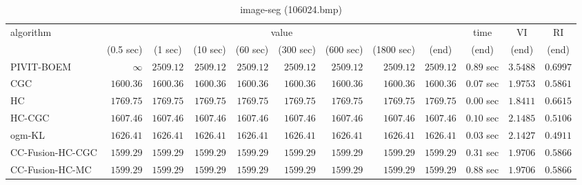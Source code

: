 \begin{table}[H]
\scriptsize
\centering
\caption{image-seg (106024.bmp)}
\label{tab:anytimetable-image-seg-106024.bmp}
\begin{tabular}{lrrrrrrrrrrr}
\toprule
           algorithm &                                   \multicolumn{8}{c}{value} & \multicolumn{1}{c}{time}    & \multicolumn{1}{c}{VI}  & \multicolumn{1}{c}{RI} \\  
\cmidrule(lr){2-9}\cmidrule(lr){10-10} \cmidrule(lr){11-11} \cmidrule(lr){12-12}   
                     & \multicolumn{1}{c}{(0.5 sec)} & \multicolumn{1}{c}{(1 sec)} & \multicolumn{1}{c}{(10 sec)} & \multicolumn{1}{c}{(60 sec)} & \multicolumn{1}{c}{(300 sec)} & \multicolumn{1}{c}{(600 sec)} & \multicolumn{1}{c}{(1800 sec)} & \multicolumn{1}{c}{(end)} & \multicolumn{1}{c}{(end)}    & \multicolumn{1}{c}{(end)}   & \multicolumn{1}{c}{(end)}  \\ \midrule 
          PIVIT-BOEM & $\infty$ & $      2509.12$ & $      2509.12$ & $      2509.12$ & $      2509.12$ & $      2509.12$ & $      2509.12$ & $      2509.12$ & $         0.89$ sec    & $       3.5488$  & $       0.6997$ \\ 
                 CGC & $      1600.36$ & $      1600.36$ & $      1600.36$ & $      1600.36$ & $      1600.36$ & $      1600.36$ & $      1600.36$ & $      1600.36$ & $         0.07$ sec    & $       1.9753$  & $       0.5861$ \\ 
                  HC & $      1769.75$ & $      1769.75$ & $      1769.75$ & $      1769.75$ & $      1769.75$ & $      1769.75$ & $      1769.75$ & $      1769.75$ & $         0.00$ sec    & $       1.8411$  & $       0.6615$ \\ 
              HC-CGC & $      1607.46$ & $      1607.46$ & $      1607.46$ & $      1607.46$ & $      1607.46$ & $      1607.46$ & $      1607.46$ & $      1607.46$ & $         0.10$ sec    & $       2.1485$  & $       0.5106$ \\ 
              ogm-KL & $      1626.41$ & $      1626.41$ & $      1626.41$ & $      1626.41$ & $      1626.41$ & $      1626.41$ & $      1626.41$ & $      1626.41$ & $         0.03$ sec    & $       2.1427$  & $       0.4911$ \\ 
    CC-Fusion-HC-CGC & $      1599.29$ & $      1599.29$ & $      1599.29$ & $      1599.29$ & $      1599.29$ & $      1599.29$ & $      1599.29$ & $      1599.29$ & $         0.31$ sec    & $       1.9706$  & $       0.5866$ \\ 
     CC-Fusion-HC-MC & $      1599.29$ & $      1599.29$ & $      1599.29$ & $      1599.29$ & $      1599.29$ & $      1599.29$ & $      1599.29$ & $      1599.29$ & $         0.88$ sec    & $       1.9706$  & $       0.5866$ \\ 

\end{tabular}
\end{table}
